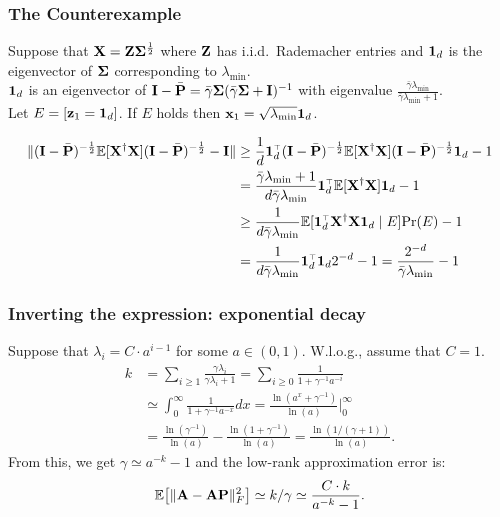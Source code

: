 \documentclass[10pt]{beamer}
\begin{document}
\begin{frame}
  \frametitle{The Counterexample}

  Suppose that $\mathbf X=\mathbf Z\mathbf{\Sigma}^{\frac12}$ where $\mathbf Z$ has
  i.i.d.~Rademacher entries and $\mathbf 1_d$ is the eigenvector of
  $\mathbf{\Sigma}$ corresponding to $\lambda_{\min}$. \\
$\mathbf 1_d$ is an eigenvector of
$\mathbf I-\bar{\mathbf P}=\bar\gamma\mathbf{\Sigma}(\bar\gamma\mathbf{\Sigma}+\mathbf I)^{-1}$ with
eigenvalue $\frac{\bar\gamma\lambda_{\min}}{\bar\gamma\lambda_{\min}+1}$.\\
Let $E = [\mathbf z_1=\mathbf 1_d]$. If $E$ holds then
  $\mathbf x_1=\sqrt{\lambda_{\min}}\mathbf 1_d$.
  
  \begin{align*}
    \|(\I-\bar\P)^{-\frac12}\E[\X^\dagger\X](\I-\bar\P)^{-\frac12}-\I\|
    &\geq \frac1d\one_d^\top
      (\I-\bar\P)^{-\frac12}\E[\X^\dagger\X](\I-\bar\P)^{-\frac12}\one_d-1\\
    &=\frac{\bar\gamma\lambda_{\min}+1}{d\bar\gamma\lambda_{\min}}
      \one_d^\top\E[\X^\dagger\X]\one_d-1\\
&\geq \frac1{d\bar\gamma\lambda_{\min}}
\E[\one_d^\top\X^\dagger\X\one_d\mid E]\Pr(E)-1\\
&=     \frac1{d\bar\gamma\lambda_{\min}}
\one_d^\top\one_d2^{-d}-1 = \frac{2^{-d}}{\bar\gamma\lambda_{\min}}-1
  \end{align*}
\end{frame}


\begin{frame}
  \frametitle{Inverting the expression: exponential decay}
  Suppose that $\lambda_i = C\cdot a^{i-1}$ for some
  $a\in(0,1)$. W.l.o.g., assume that $C=1$.
  \begin{align*}
    k&=  \sum_{i\geq 1} \frac{\gamma\lambda_i}{\gamma\lambda_i+1}
=\sum_{i\geq 0}\frac1{1 + \gamma^{-1}a^{-i}}
      \\
      & \simeq \int_0^\infty \frac1{1+\gamma^{-1}a^{-x}}dx
        =\frac{\ln(a^x+\gamma^{-1})}{\ln(a)} \Big|_0^\infty
    \\
    &= \frac{\ln(\gamma^{-1})}{\ln(a)} -
      \frac{\ln(1+\gamma^{-1})}{\ln(a)} = \frac{\ln(1/(\gamma+1))}{\ln(a)}.
  \end{align*}
 From this, we get $\gamma \simeq a^{-k}-1$ and the low-rank
 approximation error is:
 \begin{align*}
   \mathbb E\big[\|\mathbf A-\mathbf A\mathbf P\|_F^2\big] \simeq k/\gamma\simeq \frac{C\cdot k}{a^{-k}-1}.
 \end{align*}
\end{frame}
\end{document}
